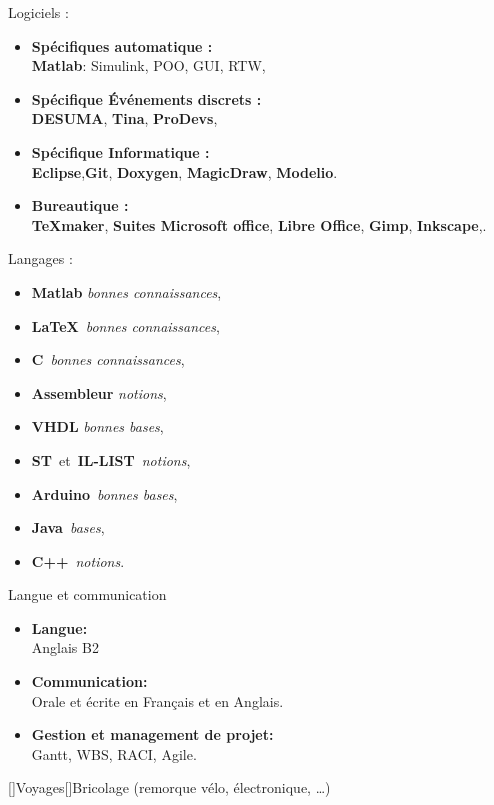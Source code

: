 \documentclass[11pt,a4paper,sans]{moderncv}        %
\newcommand{\myitem}{\textbullet}
\begin{document}
\vspace{8mm}
\tripleitemiseavecTitre%
{Logiciels :}%
{{%
	\begin{itemize}[label=\myitem]
		\item \textbf{Spécifiques automatique :}\\ \textbf{Matlab}: Simulink, POO, GUI, RTW, 
		\item \textbf{Spécifique Événements discrets :}\\ \textbf{DESUMA}, \textbf{Tina}, \textbf{ProDevs}, 
		\item \textbf{Spécifique Informatique :}\\ \textbf{Eclipse},\textbf{Git}, \textbf{Doxygen}, \textbf{MagicDraw}, \textbf{Modelio}.
		\item \textbf{Bureautique :} \\\textbf{\TeX maker}, \textbf{Suites Microsoft office}, \textbf{Libre Office}, \textbf{Gimp}, \textbf{Inkscape},.
	\end{itemize}
}}%
{Langages :}%
{%
	\begin{itemize}[label=\myitem]
		\item \textbf{Matlab} \textit{bonnes connaissances}, 
		\item \textbf{\LaTeX}~\textit{bonnes connaissances}, 
		\item \textbf{C}~\textit{bonnes connaissances},
		\item \textbf{Assembleur} \textit{notions}, 
		\item \textbf{VHDL} \textit{bonnes bases}, 
		\item \textbf{ST}~et~\textbf{IL-LIST}~\textit{notions}, 
		\item \textbf{Arduino}~\textit{bonnes bases}, 
		\item \textbf{Java}~\textit{bases}, 
		\item \textbf{C++}~\textit{notions}.%
	\end{itemize}
}%
{Langue et communication}%
{{%
	\begin{itemize}[label=\myitem]%
	\item \textbf{Langue: } \\ Anglais B2%
	\item \textbf{Communication: } \\ Orale et écrite en Français et en Anglais. %
	\item \textbf{Gestion et management de projet: } \\ Gantt, WBS, RACI, Agile.%
	\end{itemize}%
}}
\vspace{3cm}
\vspace{8mm}

[\bcfleur]{Voyages}[\bcvelo]{Bricolage (remorque vélo, électronique, …)}
%
\end{document}
